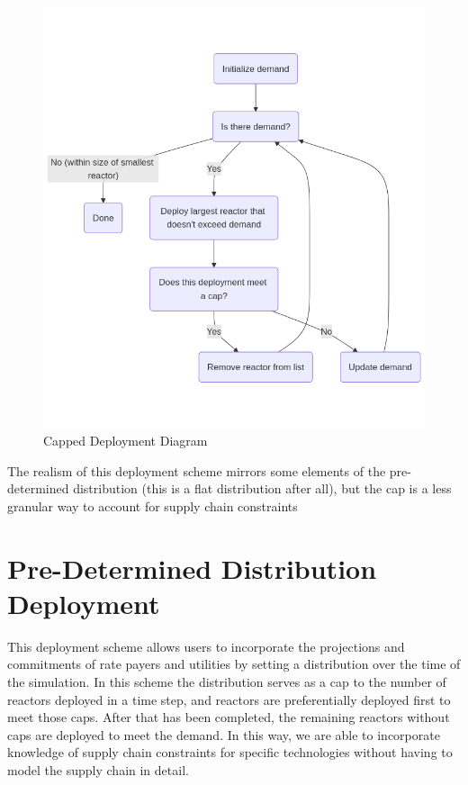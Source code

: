 \begin{figure}[!htbp]
    \centering
    \includegraphics[scale=0.4]{images/schemes/cap_diagram.png}
    \caption{Capped Deployment Diagram}
    \label{fig:cap_diagram}
\end{figure}

The realism of this deployment scheme mirrors some elements of the pre-determined distribution (this is a flat distribution after all), but the cap is a less granular way to account for supply chain constraints


\section{Pre-Determined Distribution Deployment}
This deployment scheme allows users to incorporate the projections and
commitments of rate payers and utilities by setting a distribution over the
time of the simulation. In this scheme the distribution serves as a cap to the
number of reactors deployed in a time step, and reactors are preferentially
deployed first to meet those caps. After that has been completed, the remaining
reactors without caps are deployed to meet the demand. In this way, we are able
to incorporate knowledge of supply chain constraints for specific technologies
without having to model the supply chain in detail.

